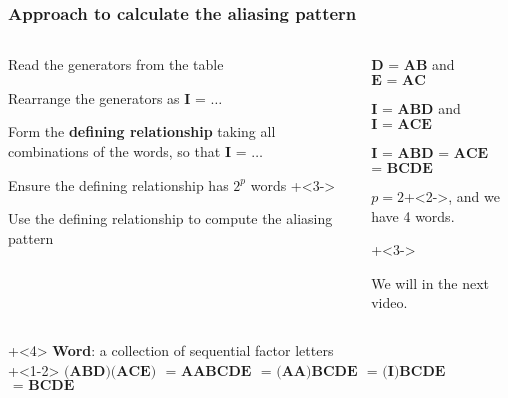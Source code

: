 \documentclass[handout,11pt,aspectratio=169,mathserif]{beamer}
\begin{document}
\begin{frame}\frametitle{Approach to calculate the aliasing pattern}
	
	\begin{columns}[T]
			\begin{enumerate}
				\item	Read the generators from the table 
					\item	Rearrange the generators as  $\textbf{I = \ldots}$
				 	\item	Form the {\color{purple}\textbf{defining relationship}} taking all combinations of the words, so that $\textbf{I = \ldots}$
				 	\item	Ensure the defining relationship has $2^p$ words
				\onslide+<3->{
					\item	Use the defining relationship to compute the aliasing pattern
				}
			\end{enumerate}
			
		\column{0.5\textwidth}
			\begin{enumerate}
				\item	$\textbf{D = AB}$  and $\textbf{E = AC}$ 
					\item	$\textbf{I = ABD}$ and $\textbf{I = ACE}$ 
 					\item	$\textbf{I =}$ $\textbf{ABD}$ $\textbf{= ACE}$ $\textbf{= BCDE}$
					\\ \vspace{0.4cm}
				
					\item	$p=2$\onslide+<2->{, and we have 4 words.}
				
				\onslide+<3->{
					\item	We will in the next video.
					
				}
			\end{enumerate}			
			
	\end{columns}
	\vspace{0.5cm}
	\onslide+<4>{
		{\color{purple}\textbf{Word}}: a collection of sequential factor letters
	}
	\\
	\onslide+<1-2>{
		$\textbf{(ABD)(ACE)}$
		$\textbf{ = AABCDE}$
		$\textbf{ = (AA)BCDE}$
		$\textbf{ = (I)BCDE}$
		$\textbf{ = BCDE}$	
	}
\end{frame}
\end{document}
